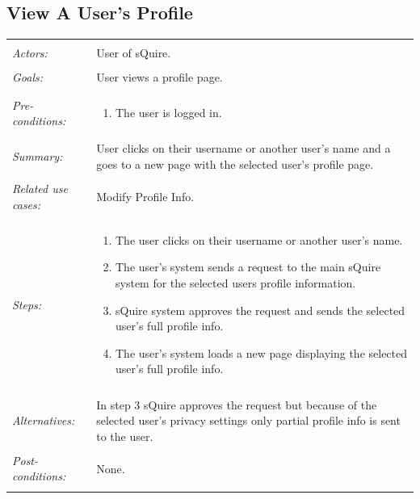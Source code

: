\documentclass[11pt]{report}
\begin{document}
\subsection{View A User's Profile}
\begin{tabular}{ p{2cm} p{12cm} }
 \hline
 \\
 \textit{Actors:} & User of sQuire. \\ 
 \\
 \textit{Goals:} & User views a profile page. \\
 \\
 \textit{Pre-conditions:} & \begin{enumerate}
  \item The user is logged in.
 \end{enumerate} \\
 \\
 \textit{Summary:} & User clicks on their username or another user's name and a goes to a new page with the selected user's profile page.\\ 
 \\
 \textit{Related use cases:} & Modify Profile Info. \\ 
 \\
 \textit{Steps:} & \begin{enumerate}
  \item The user clicks on their username or another user's name.
  \item The user's system sends a request to the main sQuire system for the selected users profile information.
  \item sQuire system approves the request and sends the selected user's full profile info.
  \item The user's system loads a new page displaying the selected user's full profile info.
 \end{enumerate} \\
 \\
 \textit{Alternatives:} & In step 3 sQuire approves the request but because of the selected user's privacy settings only partial profile info is sent to the user. \\
 \\
 \textit{Post-conditions:} & None. \\
 \\
\hline
\end{tabular}
\end{document}
